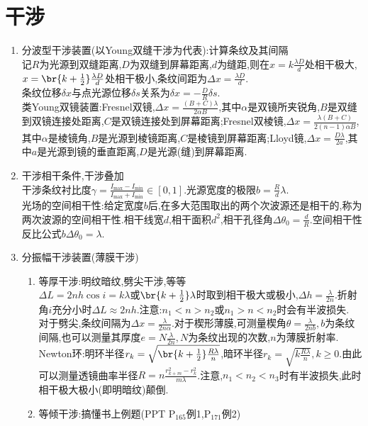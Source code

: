 \documentclass{article}
\begin{document}
\section{干涉}
\begin{enumerate}
    \item 分波型干涉装置(以Young双缝干涉为代表):计算条纹及其间隔\\
    记$R$为光源到双缝距离,$D$为双缝到屏幕距离,$d$为缝距,则在$x=k\frac{\lambda D}{d}$处相干极大,$x=\br{k+\frac{1}{2}}\frac{\lambda D}{d}$处相干极小,条纹间距为$\Delta x=\frac{\lambda D}{d}$.\\
    条纹位移$\delta x$与点光源位移$\delta s$关系为$\delta x=-\frac{D}{R}\delta s$.\\
    类Young双镜装置:Fresnel双镜,$\Delta x=\frac{(B+C)\lambda}{2\alpha B}$,其中$\alpha$是双镜所夹锐角,$B$是双缝到双镜连接处距离,$C$是双镜连接处到屏幕距离;Fresnel双棱镜,$\Delta x=\frac{\lambda(B+C)}{2(n-1)\alpha B}$,其中$\alpha$是棱镜角,$B$是光源到棱镜距离,$C$是棱镜到屏幕距离;Lloyd镜,$\Delta x=\frac{D \lambda}{2a}$,其中$a$是光源到镜的垂直距离,$D$是光源(缝)到屏幕距离.
    \item 干涉相干条件,干涉叠加\\
    干涉条纹衬比度$\gamma=\frac{I_{\max}-I_{\min}}{I_{\max}+I_{\min}}\in [0,1]$.光源宽度的极限$b=\frac{R}{d}\lambda$.\\
    光场的空间相干性:给定宽度$b$后,在多大范围取出的两个次波源还是相干的,称为两次波源的空间相干性.相干线宽$d$,相干面积$d^2$,相干孔径角$\Delta\theta_0=\frac{d}{R}$.空间相干性反比公式$b\Delta\theta_0=\lambda$.
    \item 分振幅干涉装置(薄膜干涉)
    \begin{enumerate}
        \item 等厚干涉:明纹暗纹,劈尖干涉,等等\\
        $\Delta L=2nh\cos i=k\lambda$或$\br{k+\frac{1}{2}}\lambda$时取到相干极大或极小,$\Delta h=\frac{\lambda}{2n}$.折射角$i$充分小时$\Delta L\approx 2nh$.注意:$n_1<n>n_2$或$n_1>n<n_2$时会有半波损失.\\
        对于劈尖,条纹间隔为$\Delta x=\frac{\lambda}{2n\alpha}$.对于楔形薄膜,可测量楔角$\theta=\frac{\lambda}{2nb},b$为条纹间隔,也可以测量其厚度$e=N\frac{\lambda}{2n},N$为条纹出现的次数,$n$为薄膜折射率.\\
        Newton环:明环半径$r_k=\sqrt{\br{k+\frac{1}{2}}\frac{R\lambda}{n}}$,暗环半径$r_k=\sqrt{k\frac{R\lambda}{n}},k\geq 0$.由此可以测量透镜曲率半径$R=n\frac{r_{k+m}^2-r_k^2}{m\lambda}$.注意,$n_1<n_2<n_3$时有半波损失,此时相干极大极小(即明暗纹)颠倒.
        \item 等倾干涉:搞懂书上例题(PPT P$_{165}$例1,P$_{171}$例2)\\

\end{enumerate}
\end{enumerate}
\end{document}
